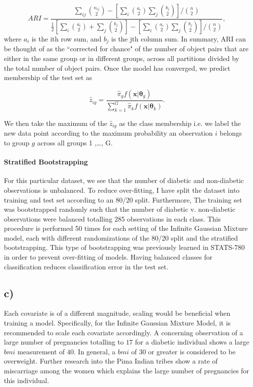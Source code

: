 \documentclass[12pt, centerh1]{article}
\begin{document}
$$ARI = \frac{ \sum_{ij} \binom{n_{ij}}{2} - [\sum_i \binom{a_i}{2} \sum_j \binom{b_j}{2}] / \binom{n}{2} }{ \frac{1}{2} [\sum_i \binom{a_i}{2} + \sum_j \binom{b_j}{2}] - [\sum_i \binom{a_i}{2} \sum_j \binom{b_j}{2}] / \binom{n}{2} }, $$
where $a_i$ is the ith row sum, and $b_j$ is the jth column sum.  In summary, ARI can be thought of as the ``corrected for chance" of the number of object pairs that are either in the same group or in different groups, across all partitions divided by the total number of object pairs. Once the model has converged, we predict membership of the test set as 

$$\hat{z}_{ig} = \frac{\hat{\pi}_{g}  f(\bm{x}| \bm{\theta}_g)  }{ \sum_{k=1}^G \hat{\pi}_{k}  f(\bm{x}| \bm{\theta}_k) }. $$

We then take the maximum of the $\hat{z}_{ig}$ as the class membership i.e. we label the new data point according to the maximum probability an observation $i$ belongs to group $g$ across all groups 1 ,\dots , G. 


\paragraph{Stratified Bootstrapping}
For this particular dataset, we see that the number of diabetic and non-diabetic observations is unbalanced. To reduce over-fitting, I have split the dataset into training and test set according to an 80/20 split. Furthermore, The training set was bootstrapped randomly such that the number of diabetic v. non-diabetic observations were balanced totalling 285 observations in each class. This procedure is performed 50 times for each setting of the Infinite Gaussian Mixture model, each with different randomizations of the 80/20 split and the stratified bootstrapping. This type of bootstrapping was previously learned in STATS-780 in order to prevent over-fitting of models. Having balanced classes for classification reduces classification error in the test set. 

\subsection*{c)}

 Each covariate is of a different magnitude, scaling would be beneficial when training a model. Specifically, for the Infinite Gaussian Mixture Model, it is recommended to scale each covariate accordingly.
A concerning observation of a large number of pregnancies totalling to $17$ for a diabetic individual shows a large $bmi$ measurement of $40$. In general, a $bmi$ of 30 or greater is considered to be overweight.
Further research into the Pima Indian tribes show a rate of miscarriage among the women which explains the large number of pregnancies for this individual. 
\end{document}
